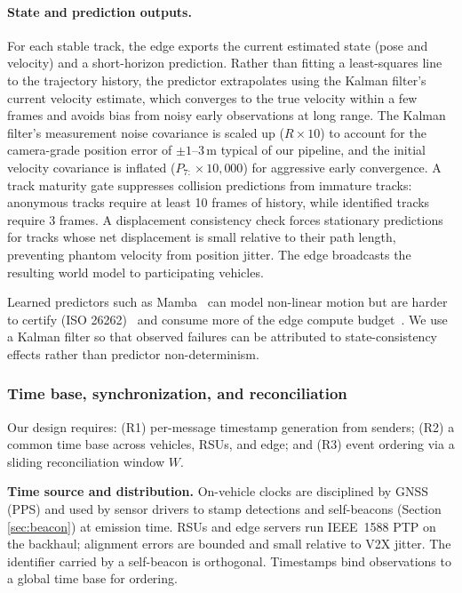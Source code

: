 \paragraph{State and prediction outputs.}
For each stable track, the edge exports the current estimated state (pose and velocity) and a short-horizon prediction. Rather than fitting a least-squares line to the trajectory history, the predictor extrapolates using the Kalman filter's current velocity estimate, which converges to the true velocity within a few frames and avoids bias from noisy early observations at long range. The Kalman filter's measurement noise covariance is scaled up ($R \times 10$) to account for the camera-grade position error of $\pm 1$--$3$\,m typical of our pipeline, and the initial velocity covariance is inflated ($P_{7{:}} \times 10{,}000$) for aggressive early convergence. A track maturity gate suppresses collision predictions from immature tracks: anonymous tracks require at least 10 frames of history, while identified tracks require 3 frames. A displacement consistency check forces stationary predictions for tracks whose net displacement is small relative to their path length, preventing phantom velocity from position jitter. The edge broadcasts the resulting world model to participating vehicles.

Learned predictors such as Mamba~\cite{huang2025mambamotstatespacemodelmotion, mambatrack} can model non-linear motion but are harder to certify (ISO 26262)~\cite{Serna2020} and consume more of the edge compute budget~\cite{fusionlatencywacv2025}. We use a Kalman filter so that observed failures can be attributed to state-consistency effects rather than predictor non-determinism.

\subsubsection{Time base, synchronization, and reconciliation}
\label{sec:timebase}
Our design requires: (R1) per-message timestamp {generation}  from senders; (R2) a common time base across vehicles, RSUs, and edge; and (R3) event ordering via a sliding reconciliation window \(W\).

\textbf{Time source and distribution.}
On-vehicle clocks are disciplined by GNSS (PPS) and used by sensor drivers to stamp detections and self-beacons (Section \ref{sec:beacon}) at emission time. RSUs and edge servers run IEEE~1588 PTP on the backhaul; alignment errors are bounded and small relative to V2X jitter. The identifier carried by a self-beacon is orthogonal. Timestamps bind observations to a global time base for ordering.

